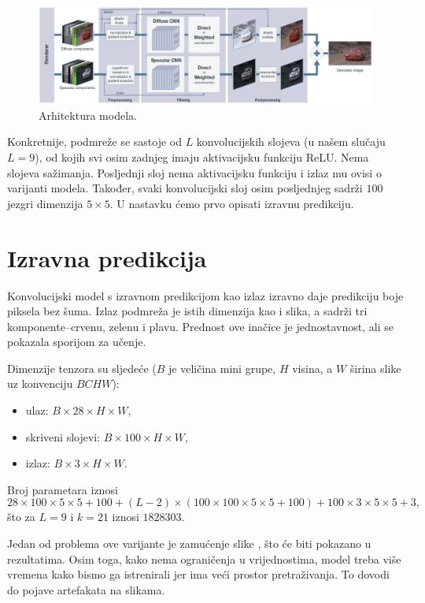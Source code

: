 \documentclass[times, utf8, seminar, numeric]{fer}
\begin{document}
\begin{figure}[H]
  \centering
  \includegraphics[width=\textwidth]{architecture.png}
  \caption{Arhitektura modela.}
  \label{fig:architecture}
\end{figure}

Konkretnije, podmreže se sastoje od $L$ konvolucijskih slojeva (u našem slučaju $L = 9$), od
kojih svi osim zadnjeg imaju aktivacijsku funkciju ReLU. Nema slojeva sažimanja. Posljednji
sloj nema aktivacijsku funkciju i izlaz mu ovisi o varijanti modela. Također, svaki konvolucijski
sloj osim posljednjeg sadrži $100$ jezgri dimenzija $5\times5$. U nastavku ćemo prvo opisati izravnu predikciju.

\section{Izravna predikcija}
Konvolucijski model s izravnom predikcijom 
kao izlaz izravno daje predikciju boje piksela bez šuma. Izlaz podmreža je
istih dimenzija kao i slika, a sadrži tri komponente--crvenu, zelenu i plavu. Prednost ove
inačice je jednostavnost, ali se pokazala sporijom za učenje.

Dimenzije tenzora su sljedeće ($B$ je veličina mini grupe, $H$ visina, a $W$ širina slike uz
konvenciju $BCHW$):
\begin{itemize}
\item ulaz: $B \times 28 \times H \times W$,
\item skriveni slojevi: $B \times 100 \times H \times W$,
\item izlaz: $B \times 3 \times H \times W$.
\end{itemize}
Broj parametara iznosi
$$28\times100\times5\times5+100+(L-2)\times(100\times100\times5\times5+100)
+100\times3\times5\times5+3,$$
što za $L=9$ i $k=21$ iznosi $1828303$.

Jedan od problema ove varijante je zamućenje slike , što će biti pokazano
u rezultatima. Osim toga, kako nema ograničenja u vrijednostima, model treba više vremena
kako bismo ga istrenirali jer ima veći prostor pretraživanja. To dovodi do pojave artefakata
na slikama.
\end{document}
